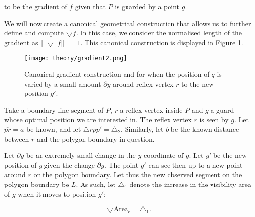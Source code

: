 to be the gradient of $f$ given that $P$ is guarded by a point $g$. 

We will now create a canonical geometrical construction that allows us to further define and compute $\bigtriangledown f$. In this case, we consider the normalised length of the gradient as $||~\bigtriangledown~f||~=~1$. This canonical construction is displayed in Figure \ref{fig:gradient}. 

\begin{figure}[h!]
    \centering
    \texttt{[image: theory/gradient2.png]}
    \caption{Canonical gradient construction and for when the position of $g$ is varied by a small amount $\partial y$ around reflex vertex $r$ to the new position $g'$.}
    \label{fig:gradient}
\end{figure}

Take a boundary line segment of $P$, $r$ a reflex vertex inside $P$ and $g$ a guard whose optimal position we are interested in. The reflex vertex $r$ is seen by $g$. Let $\overline{pr} = a$ be known, and let $\triangle rpp' = \triangle_2$. Similarly, let $b$ be the known distance between $r$ and the polygon boundary in question.



Let $\partial y$ be an extremely small change in the $y$-coordinate of $g$. Let $g'$ be the new position of $g$ given the change $\partial y$. The point $g'$ can see then up to a new point around $r$ on the polygon boundary. Let thus the new observed segment on the polygon boundary be $L$. As such, let $\triangle_1$ denote the increase in the visibility area of $g$ when it moves to position $g'$:

\begin{equation}
    \bigtriangledown \text{Area}_r = \triangle_1. \label{eq:derivative}
\end{equation}





